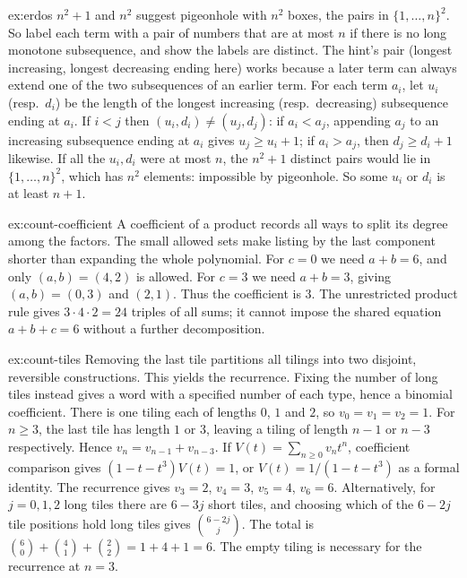 \begin{solution}{ex:erdos}
\idea $n^2+1$ and $n^2$ suggest pigeonhole with $n^2$ boxes, the pairs in $\{1,\dots,n\}^2$. So label each term with a pair of numbers that are at most $n$ if there is no long monotone subsequence, and show the labels are distinct. The hint's pair (longest increasing, longest decreasing ending here) works because a later term can always extend one of the two subsequences of an earlier term.
\writeup For each term $a_i$, let $u_i$ (resp.\ $d_i$) be the length of the longest increasing (resp.\ decreasing) subsequence ending at $a_i$. If $i<j$ then $(u_i,d_i)\ne(u_j,d_j)$:
if $a_i<a_j$, appending $a_j$ to an increasing subsequence ending at $a_i$ gives $u_j\ge u_i+1$; if $a_i>a_j$, then $d_j\ge d_i+1$ likewise. If all the $u_i,d_i$ were at most $n$, the $n^2+1$ distinct pairs would lie in
$\{1,\dots,n\}^2$, which has $n^2$ elements: impossible by pigeonhole. So some $u_i$ or $d_i$ is at least $n+1$.
\end{solution}

\begin{solution}{ex:count-coefficient}
\idea A coefficient of a product records all ways to split its degree among the factors. The small allowed sets make listing by the last component shorter than expanding the whole polynomial.
\writeup For $c=0$ we need $a+b=6$, and only $(a,b)=(4,2)$ is allowed. For $c=3$ we need $a+b=3$, giving $(a,b)=(0,3)$ and $(2,1)$. Thus the coefficient is $3$. The unrestricted product rule gives $3\cdot4\cdot2=24$ triples of all sums; it cannot impose the shared equation $a+b+c=6$ without a further decomposition.
\end{solution}

\begin{solution}{ex:count-tiles}
\idea Removing the last tile partitions all tilings into two disjoint, reversible constructions. This yields the recurrence. Fixing the number of long tiles instead gives a word with a specified number of each type, hence a binomial coefficient.
\writeup There is one tiling each of lengths $0$, $1$ and $2$, so $v_0=v_1=v_2=1$. For $n\ge3$, the last tile has length $1$ or $3$, leaving a tiling of length $n-1$ or $n-3$ respectively. Hence $v_n=v_{n-1}+v_{n-3}$. If $V(t)=\sum_{n\ge0}v_nt^n$, coefficient comparison gives $(1-t-t^3)V(t)=1$, or $V(t)=1/(1-t-t^3)$ as a formal identity. The recurrence gives $v_3=2$, $v_4=3$, $v_5=4$, $v_6=6$. Alternatively, for $j=0,1,2$ long tiles there are $6-3j$ short tiles, and choosing which of the $6-2j$ tile positions hold long tiles gives $\binom{6-2j}{j}$. The total is $\binom60+\binom41+\binom22=1+4+1=6$. The empty tiling is necessary for the recurrence at $n=3$.
\end{solution}

